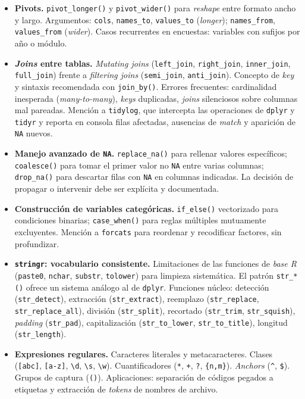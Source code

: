 \documentclass[11pt,letterpaper]{article}
\begin{document}
\begin{itemize}[leftmargin=*, itemsep=2pt]
    \item \textbf{Pivots.} \texttt{pivot\_longer()} y \texttt{pivot\_wider()} para \textit{reshape} entre formato ancho y largo. Argumentos: \texttt{cols}, \texttt{names\_to}, \texttt{values\_to} (\textit{longer}); \texttt{names\_from}, \texttt{values\_from} (\textit{wider}). Casos recurrentes en encuestas: variables con sufijos por año o módulo.
    \item \textbf{\textit{Joins} entre tablas.} \textit{Mutating joins} (\texttt{left\_join}, \texttt{right\_join}, \texttt{inner\_join}, \texttt{full\_join}) frente a \textit{filtering joins} (\texttt{semi\_join}, \texttt{anti\_join}). Concepto de \textit{key} y sintaxis recomendada con \texttt{join\_by()}. Errores frecuentes: cardinalidad inesperada (\textit{many-to-many}), \textit{keys} duplicadas, \textit{joins} silenciosos sobre columnas mal pareadas. Mención a \texttt{tidylog}, que intercepta las operaciones de \texttt{dplyr} y \texttt{tidyr} y reporta en consola filas afectadas, ausencias de \textit{match} y aparición de \texttt{NA} nuevos.
    \item \textbf{Manejo avanzado de \texttt{NA}.} \texttt{replace\_na()} para rellenar valores específicos; \texttt{coalesce()} para tomar el primer valor no \texttt{NA} entre varias columnas; \texttt{drop\_na()} para descartar filas con \texttt{NA} en columnas indicadas. La decisión de propagar o intervenir debe ser explícita y documentada.
    \item \textbf{Construcción de variables categóricas.} \texttt{if\_else()} vectorizado para condiciones binarias; \texttt{case\_when()} para reglas múltiples mutuamente excluyentes. Mención a \texttt{forcats} para reordenar y recodificar factores, sin profundizar.
    \item \textbf{\texttt{stringr}: vocabulario consistente.} Limitaciones de las funciones de \textit{base R} (\texttt{paste0}, \texttt{nchar}, \texttt{substr}, \texttt{tolower}) para limpieza sistemática. El patrón \texttt{str\_*()} ofrece un sistema análogo al de \texttt{dplyr}. Funciones núcleo: detección (\texttt{str\_detect}), extracción (\texttt{str\_extract}), reemplazo (\texttt{str\_replace}, \texttt{str\_replace\_all}), división (\texttt{str\_split}), recortado (\texttt{str\_trim}, \texttt{str\_squish}), \textit{padding} (\texttt{str\_pad}), capitalización (\texttt{str\_to\_lower}, \texttt{str\_to\_title}), longitud (\texttt{str\_length}).
    \item \textbf{Expresiones regulares.} Caracteres literales y metacaracteres. Clases (\texttt{[abc]}, \texttt{[a-z]}, \texttt{\textbackslash d}, \texttt{\textbackslash s}, \texttt{\textbackslash w}). Cuantificadores (\texttt{*}, \texttt{+}, \texttt{?}, \texttt{\{n,m\}}). \textit{Anchors} (\texttt{\textasciicircum}, \texttt{\$}). Grupos de captura (\texttt{()}). Aplicaciones: separación de códigos pegados a etiquetas y extracción de \textit{tokens} de nombres de archivo.

\end{itemize}
\end{document}
